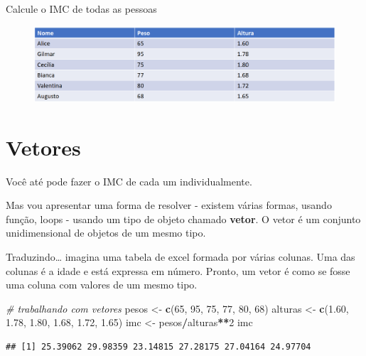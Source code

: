 \documentclass[
]{article}
\newenvironment{Shaded}{\begin{snugshade}}{\end{snugshade}}
\newcommand{\CommentTok}[1]{\textcolor[rgb]{0.56,0.35,0.01}{\textit{#1}}}
\newcommand{\DecValTok}[1]{\textcolor[rgb]{0.00,0.00,0.81}{#1}}
\newcommand{\FloatTok}[1]{\textcolor[rgb]{0.00,0.00,0.81}{#1}}
\newcommand{\KeywordTok}[1]{\textcolor[rgb]{0.13,0.29,0.53}{\textbf{#1}}}
\newcommand{\NormalTok}[1]{#1}
\newcommand{\OperatorTok}[1]{\textcolor[rgb]{0.81,0.36,0.00}{\textbf{#1}}}
\newcommand{\StringTok}[1]{\textcolor[rgb]{0.31,0.60,0.02}{#1}}
\begin{document}
Calcule o IMC de todas as pessoas

\begin{figure}

{\centering \includegraphics[width=0.9\linewidth,height=0.9\textheight]{imagem/imc} 

}

\caption{ }\label{fig:imc, figures-side}
\end{figure}

\hypertarget{vetores}{%
\section{Vetores}\label{vetores}}

Você até pode fazer o IMC de cada um individualmente.

Mas vou apresentar uma forma de resolver - existem várias formas, usando
função, loops - usando um tipo de objeto chamado \textbf{vetor}. O vetor
é um conjunto unidimensional de objetos de um mesmo tipo.

Traduzindo\ldots{} imagina uma tabela de excel formada por várias
colunas. Uma das colunas é a idade e está expressa em número. Pronto, um
vetor é como se fosse uma coluna com valores de um mesmo tipo.

\begin{Shaded}
\begin{Highlighting}[]
\CommentTok{# trabalhando com vetores}
\NormalTok{pesos <-}\StringTok{ }\KeywordTok{c}\NormalTok{(}\DecValTok{65}\NormalTok{, }\DecValTok{95}\NormalTok{, }\DecValTok{75}\NormalTok{, }\DecValTok{77}\NormalTok{, }\DecValTok{80}\NormalTok{, }\DecValTok{68}\NormalTok{)}
\NormalTok{alturas <-}\StringTok{ }\KeywordTok{c}\NormalTok{(}\FloatTok{1.60}\NormalTok{, }\FloatTok{1.78}\NormalTok{, }\FloatTok{1.80}\NormalTok{, }\FloatTok{1.68}\NormalTok{, }\FloatTok{1.72}\NormalTok{, }\FloatTok{1.65}\NormalTok{)}
\NormalTok{imc <-}\StringTok{ }\NormalTok{pesos}\OperatorTok{/}\NormalTok{alturas}\OperatorTok{**}\DecValTok{2}
\NormalTok{imc}
\end{Highlighting}
\end{Shaded}

\begin{verbatim}
## [1] 25.39062 29.98359 23.14815 27.28175 27.04164 24.97704
\end{verbatim}
\end{document}
